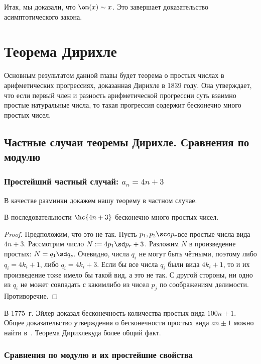 \documentclass[a4paper]{article}
\begin{document}
Итак, мы доказали, что $\om(x) \sim x$. Это завершает доказательство асимптотического закона.

\section{Теорема Дирихле}

Основным результатом данной главы будет теорема о простых числах в арифметических прогрессиях,
доказанная Дирихле в 1839 году. Она утверждает, что если первый член и разность арифметической
прогрессии суть взаимно простые натуральные числа, то такая прогрессия содержит бесконечно много простых чисел.

\subsection{Частные случаи теоремы Дирихле. Сравнения по модулю}

\subsubsection{Простейший частный случай: $a_n = 4n+3$}

В качестве разминки докажем нашу теорему в частном случае.

\begin{stm}
В последовательности $\hc{4n+3}$ бесконечно много простых чисел.
\end{stm}
\begin{proof}
Предположим, что это не так. Пусть $p_1,p_2\sco p_r$\т  все простые числа вида $4n+3$. Рассмотрим число
$N:=4p_1\sd p_r+3$. Разложим $N$ в произведение простых: $N=q_1\sd q_s$. Очевидно, числа $q_i$
не могут быть чётными, поэтому либо $q_i=4k_i+1$, либо $q_i=4k_i+3$. Если бы все числа $q_i$ были вида
$4k_i+1$, то и их произведение тоже имело бы такой вид, а это не так. С другой стороны, ни одно из $q_i$
не может совпадать с каким\д либо из чисел $p_j$ по соображениям делимости. Противоречие.
\end{proof}

\begin{petit}
В 1775~г. Эйлер доказал бесконечность количества простых вида $100n+1$. Общее доказательство утверждения о
бесконечности простых вида $an\pm 1$ можно найти в~\cite{hass}. Теорема Дирихле\т куда более общий факт.
\end{petit}

\subsubsection{Сравнения по модулю и их простейшие свойства}
\end{document}
